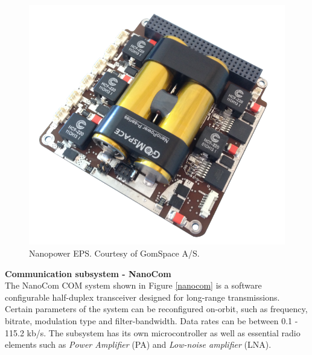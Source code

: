 \documentclass[english,12pt,a4paper,pdftex,elec,utf8]{aaltothesis}
\begin{document}
\\
\begin{figure}[h!]
\centering
\includegraphics[scale=0.2]{nanopower}
\caption{Nanopower EPS. Courtesy of GomSpace A/S. \cite{nanopowerds}}
\label{nanopower}
\end{figure}
\textbf{Communication subsystem - NanoCom}\\
The NanoCom COM system shown in Figure \ref{nanocom} is a software configurable half-duplex transceiver designed for long-range transmissions. Certain parameters of the system can be      reconfigured on-orbit, such as frequency, bitrate, modulation type and filter-bandwidth. Data rates can be between 0.1 - 115.2 kb/s. The subsystem has its own microcontroller as well as essential radio elements such as \textit{Power Amplifier} (PA) and \textit{Low-noise amplifier} (LNA). \cite{nanocomds}\\
\\ 
\end{document}
